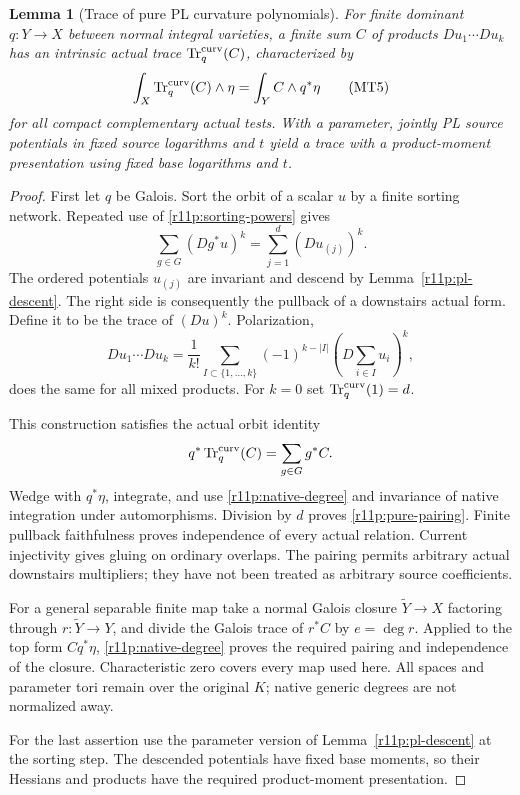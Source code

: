 \documentclass[11pt,a4paper]{article}
\newtheorem{lemma}[theorem]{Lemma}
\theoremstyle{definition}
\theoremstyle{remark}
\begin{document}
\begin{lemma}[Trace of pure PL curvature polynomials]
\label{r11p:pure-trace}
For finite dominant $q:Y\to X$ between normal integral varieties, a
finite sum $C$ of products $Du_1\cdots Du_k$ has an intrinsic actual
trace $\operatorname{Tr}^{\rm curv}_q(C)$, characterized by
\[
 \int_X\operatorname{Tr}^{\rm curv}_q(C)\wedge\eta
                         =\int_YC\wedge q^*\eta
\tag{MT5}\label{r11p:pure-pairing}
\]
for all compact complementary actual tests.  With a parameter, jointly
PL source potentials in fixed source logarithms and $t$ yield a trace
with a product-moment presentation using fixed base logarithms and $t$.
\end{lemma}

\begin{proof}
First let $q$ be Galois.  Sort the orbit of a scalar $u$ by a finite
sorting network.  Repeated use of \eqref{r11p:sorting-powers} gives
\[
                     \sum_{g\in G}(Dg^*u)^k
                            =\sum_{j=1}^d(Du_{(j)})^k.
\]
The ordered potentials $u_{(j)}$ are invariant and descend by
Lemma~\ref{r11p:pl-descent}.  The right side is consequently the
pullback of a downstairs actual form.  Define it to be the trace of
$(Du)^k$.  Polarization,
\[
 Du_1\cdots Du_k
   =\frac1{k!}\sum_{I\subset\{1,\ldots,k\}}
           (-1)^{k-|I|}\left(D\sum_{i\in I}u_i\right)^k,
\]
does the same for all mixed products.  For $k=0$ set
$\operatorname{Tr}^{\rm curv}_q(1)=d$.

This construction satisfies the actual orbit identity
\[
                 q^*\operatorname{Tr}^{\rm curv}_q(C)
                                      =\sum_{g\in G}g^*C.
\]
Wedge with $q^*\eta$, integrate, and use
\eqref{r11p:native-degree} and invariance of native integration under
automorphisms.  Division by $d$ proves \eqref{r11p:pure-pairing}.
Finite pullback faithfulness proves independence of every actual
relation.  Current injectivity gives gluing on ordinary overlaps.
The pairing permits arbitrary actual downstairs multipliers; they
have not been treated as arbitrary source coefficients.

For a general separable finite map take a normal Galois closure
$\widetilde Y\to X$ factoring through $r:\widetilde Y\to Y$, and divide
the Galois trace of $r^*C$ by $e=\deg r$.  Applied to the top form
$Cq^*\eta$, \eqref{r11p:native-degree} proves the required pairing and
independence of the closure.  Characteristic zero covers every map
used here.  All spaces and parameter tori remain over the original
$K$; native generic degrees are not normalized away.

For the last assertion use the parameter version of
Lemma~\ref{r11p:pl-descent} at the sorting step.  The descended
potentials have fixed base moments, so their Hessians and products
have the required product-moment presentation.
\end{proof}
\end{document}
